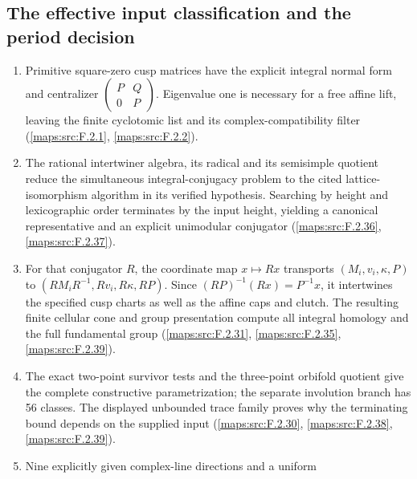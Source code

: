\subsection{The effective input classification and the period decision}
\RungOne
\begin{enumerate}[label=\arabic*.]
\item Primitive square-zero cusp matrices have the explicit integral
  normal form and centralizer
  $\left(\begin{smallmatrix}P&Q\\0&P\end{smallmatrix}\right)$.
  Eigenvalue one is necessary for a free affine lift, leaving the
  finite cyclotomic list and its complex-compatibility filter
  (\cref{maps:src:F.2.1}, \cref{maps:src:F.2.2}).
\item The rational intertwiner algebra, its radical and its
  semisimple quotient reduce the simultaneous integral-conjugacy
  problem to the cited lattice-isomorphism algorithm in its verified
  hypothesis.  Searching by height and lexicographic order terminates
  by the input height, yielding a canonical representative and an
  explicit unimodular conjugator (\cref{maps:src:F.2.36}, \cref{maps:src:F.2.37}).
\item For that conjugator $R$, the coordinate map $x\mapsto Rx$
  transports $(M_i,v_i,\kappa,P)$ to
  $(RM_iR^{-1},Rv_i,R\kappa,RP)$.  Since
  $(RP)^{-1}(Rx)=P^{-1}x$, it intertwines the specified cusp charts
  as well as the affine caps and clutch.  The resulting finite
  cellular cone and group presentation compute all integral homology
  and the full fundamental group (\cref{maps:src:F.2.31}, \cref{maps:src:F.2.35}, \cref{maps:src:F.2.39}).
\item The exact two-point survivor tests and the three-point
  orbifold quotient give the complete constructive parametrization;
  the separate involution branch has 56 classes.  The displayed
  unbounded trace family proves why the terminating bound depends on
  the supplied input (\cref{maps:src:F.2.30}, \cref{maps:src:F.2.38}, \cref{maps:src:F.2.39}).
\item Nine explicitly given complex-line directions and a uniform

\end{enumerate}
